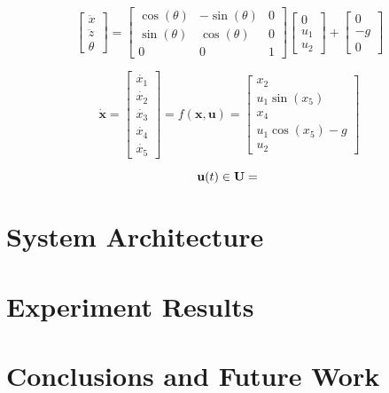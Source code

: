 \documentclass[letterpaper, 10 pt, conference]{ieeeconf}
\begin{document}
\begin{equation}
  \begin{bmatrix}
    \ddot{x} \\
    \ddot{z} \\
    \theta
  \end{bmatrix} =
  \begin{bmatrix}
    \cos(\theta) & -\sin(\theta) & 0 \\
    \sin(\theta) & \cos(\theta) & 0 \\
    0 & 0 & 1
  \end{bmatrix}
  \begin{bmatrix} 0 \\ u_{1} \\ u_{2} \end{bmatrix} +
  \begin{bmatrix} 0 \\ -g \\ 0 \end{bmatrix}
\end{equation}

\begin{equation}
  \dot{\textbf{x}} =
    \begin{bmatrix}
      \dot{x_{1}} \\ \dot{x_{2}} \\ \dot{x_{3}} \\ \dot{x_{4}} \\ \dot{x_{5}}
    \end{bmatrix} =
    f(\textbf{x}, \textbf{u}) =
    \begin{bmatrix}
      x_{2} \\
      u_{1} \sin(x_{5}) \\
      x_{4} \\
      u_{1} \cos(x_{5}) - g \\
      u_{2}
    \end{bmatrix}
\end{equation}

\begin{equation}
  \textbf{u}(t) \in \textbf{U} = \\
\end{equation}

\section{System Architecture}


\section{Experiment Results}



\section{Conclusions and Future Work}



\end{document}
